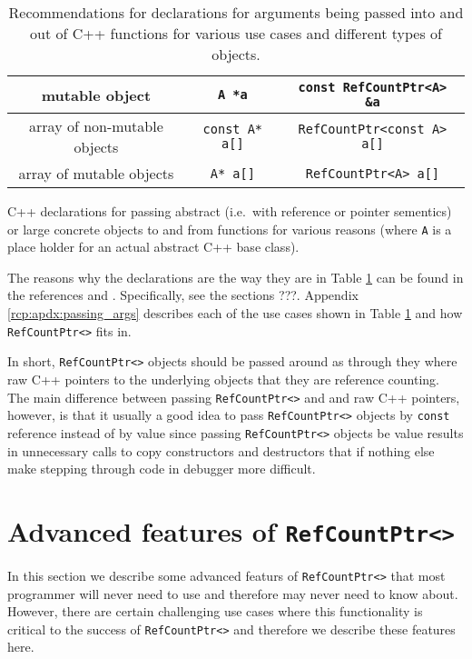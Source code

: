 \begin{table}
\begin{minipage}{{}\textwidth}
\begin{tabular}{|c|c|c|}
\hline
mutable object
& {}\texttt{A *a}
& {}\texttt{const RefCountPtr<A> \&a} \\
\hline
array of non-mutable objects
& {}\texttt{const A* a[]}
& {}\texttt{RefCountPtr<const A> a[]} \\
\hline
array of mutable objects
& {}\texttt{A* a[]}
& {}\texttt{RefCountPtr<A> a[]} \\
\hline
\end{tabular}
\begin{center}
C++ declarations for passing abstract (i.e.~with reference or pointer
sementics) or large concrete objects to and from functions for various
reasons (where {}\texttt{A} is a place holder for an actual abstract C++
base class).
\end{center}
\end{minipage}
%
\caption{\label{rcp:tbl:fnc-decl}
Recommendations for declarations for arguments being passed into and
out of C++ functions for various use cases and different types of
objects.}
%
\end{table}

The reasons why the declarations are the way they are in Table
{}\ref{rcp:tbl:fnc-decl} can be found in the references
{}\cite{ref:stroustrup_2000} and {}\cite{ref:meyers_1994}.
Specifically, see the sections ???.  Appendix
{}\ref{rcp:apdx:passing_args} describes each of the use cases shown in
Table {}{}\ref{rcp:tbl:fnc-decl} and how {}\texttt{RefCountPtr<>} fits
in.

In short, {}\texttt{RefCountPtr<>} objects should be passed around as
through they where raw C++ pointers to the underlying objects that
they are reference counting.  The main difference between passing
{}\texttt{RefCountPtr<>} and and raw C++ pointers, however, is that it
usually a good idea to pass {}\texttt{RefCountPtr<>} objects by
{}\texttt{const} reference instead of by value since passing
{}\texttt{RefCountPtr<>} objects be value results in unnecessary calls
to copy constructors and destructors that if nothing else make
stepping through code in debugger more difficult.

%
\section{Advanced features of {}\texttt{RefCountPtr<>}}
%

In this section we describe some advanced featurs of
{}\texttt{RefCountPtr<>} that most programmer will never need to use and
therefore may never need to know about.  However, there are certain
challenging use cases where this functionality is critical to the
success of {}\texttt{RefCountPtr<>} and therefore we describe these
features here.


